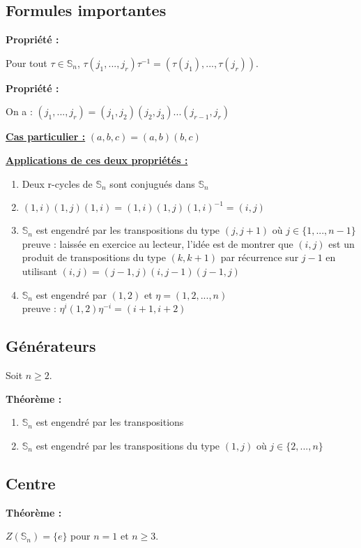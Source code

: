 \documentclass{report}
\newenvironment{prop}{\begin{tcolorbox}[colframe= white]
    \textbf{Propriété :}
     \par}
    {\end{tcolorbox}}
\newenvironment{theoreme}[1][]{
    \begin{tcolorbox}[]
    \textbf{Théorème :} #1  \par} 
    {\end{tcolorbox}}
\newcommand{\sn}{\mathbb{S}_n}
\begin{document}
\subsection{Formules importantes}
\begin{prop}
Pour tout $\tau\in\sn$, $\tau(j_1,...,j_r)\tau^{-1}=(\tau(j_1),...,\tau(j_r))$.
\end{prop}
\begin{prop}
On a  : $(j_1,...,j_r)=(j_1,j_2)(j_2,j_3)...(j_{r-1},j_r)$
\end{prop}

\noindent\underline{\textbf{Cas particulier :}} $(a,b,c)=(a,b)(b,c)$

\noindent\underline{\textbf{Applications de ces deux propriétés :}}
\begin{enumerate}
\item Deux r-cycles de $\sn$ sont conjugués dans $\sn$
\item $(1, i)(1,j)(1,i)=(1,i)(1,j)(1,i)^{-1}=(i,j)$
\item $\sn$ est engendré par les transpositions du type $(j, j+1)$ où $j\in\{1,...,n-1\}$\\
preuve : laissée en exercice au lecteur, l'idée est de montrer que $(i,j)$ est un produit de transpositions du type $(k,k+1)$ par récurrence sur $j-1$ en utilisant $(i,j)=(j-1,j)(i,j-1)(j-1,j)$
\item $\sn$ est engendré par $(1,2)$ et $\eta=(1,2,...,n)$\\
preuve : $\eta^i(1,2)\eta^{-i}=(i+1,i+2)$
\end{enumerate}

\subsection{Générateurs}
Soit $n \geq 2$.

\begin{theoreme}
\begin{enumerate}
\item $\sn$ est engendré par les transpositions
\item $\sn$ est engendré par les transpositions du type $(1,j)$ où $j\in\{2,...,n\}$
\end{enumerate}
\end{theoreme}

\subsection{Centre}
\begin{theoreme}
$Z(\sn)=\{e\}$ pour $n=1$ et $n\geq3$.
\end{theoreme}
\end{document}
